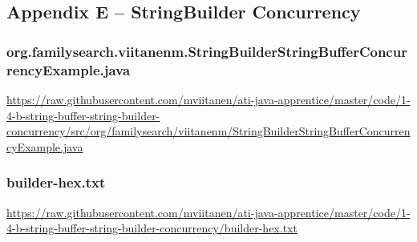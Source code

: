 \subsection*{Appendix E -- StringBuilder Concurrency} \label{App:AppendixE}

\subsubsection*{org.familysearch.viitanenm.StringBuilderStringBufferConcurrencyExample.java}
\noindent
\begin{minipage}{.6in}
\end{minipage}
\begin{minipage}{6in}
  \url{https://raw.githubusercontent.com/mviitanen/ati-java-apprentice/master/code/1-4-b-string-buffer-string-builder-concurrency/src/org/familysearch/viitanenm/StringBuilderStringBufferConcurrencyExample.java}
\end{minipage}

\subsubsection*{builder-hex.txt}
\noindent
\begin{minipage}{.6in}
\end{minipage}
\begin{minipage}{6in}
  \url{https://raw.githubusercontent.com/mviitanen/ati-java-apprentice/master/code/1-4-b-string-buffer-string-builder-concurrency/builder-hex.txt}
\end{minipage}

